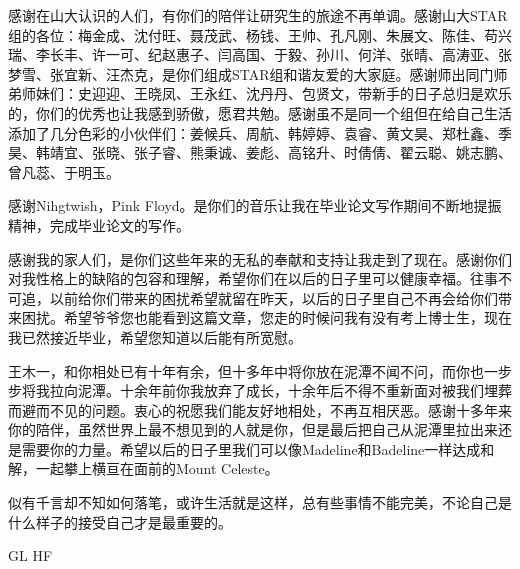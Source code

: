 感谢在山大认识的人们，有你们的陪伴让研究生的旅途不再单调。感谢山大STAR组的各位：梅金成、沈付旺、聂茂武、杨钱、王帅、孔凡刚、朱展文、陈佳、苟兴瑞、李长丰、许一可、纪赵惠子、闫高国、于毅、孙川、何洋、张晴、高涛亚、张梦雪、张宜新、汪杰克，是你们组成STAR组和谐友爱的大家庭。感谢师出同门师弟师妹们：史迎迎、王晓凤、王永红、沈丹丹、包贤文，带新手的日子总归是欢乐的，你们的优秀也让我感到骄傲，愿君共勉。感谢虽不是同一个组但在给自己生活添加了几分色彩的小伙伴们：姜候兵、周航、韩婷婷、袁睿、黄文昊、郑杜鑫、季昊、韩靖宜、张晓、张子睿、熊秉诚、姜彪、高铭升、时倩倩、翟云聪、姚志鹏、曾凡蕊、于明玉。

感谢Nihgtwish，Pink Floyd。是你们的音乐让我在毕业论文写作期间不断地提振精神，完成毕业论文的写作。

感谢我的家人们，是你们这些年来的无私的奉献和支持让我走到了现在。感谢你们对我性格上的缺陷的包容和理解，希望你们在以后的日子里可以健康幸福。往事不可追，以前给你们带来的困扰希望就留在昨天，以后的日子里自己不再会给你们带来困扰。希望爷爷您也能看到这篇文章，您走的时候问我有没有考上博士生，现在我已然接近毕业，希望您知道以后能有所宽慰。

王木一，和你相处已有十年有余，但十多年中将你放在泥潭不闻不问，而你也一步步将我拉向泥潭。十余年前你我放弃了成长，十余年后不得不重新面对被我们埋葬而避而不见的问题。衷心的祝愿我们能友好地相处，不再互相厌恶。感谢十多年来你的陪伴，虽然世界上最不想见到的人就是你，但是最后把自己从泥潭里拉出来还是需要你的力量。希望以后的日子里我们可以像Madeline和Badeline一样达成和解，一起攀上横亘在面前的Mount Celeste。

似有千言却不知如何落笔，或许生活就是这样，总有些事情不能完美，不论自己是什么样子的接受自己才是最重要的。

GL HF
\\
\\
